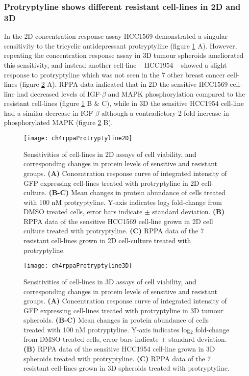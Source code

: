 \documentclass[a4paper,11pt,twoside,openright]{scrbook}
\begin{document}
\subsubsection{Protryptyline shows different resistant cell-lines in 2D and 3D}
In the 2D concentration response assay HCC1569 demonstrated a singular sensitivity to the tricyclic antidepressant 
protryptyline (figure \ref{figure:rppa_protryptyline2D} A).
However, repeating the concentration response assay in 3D tumour spheroids ameliorated this sensitivity, and instead 
another cell-line -- HCC1954 -- showed a slight response to protryptyline which was not seen in the 7 other breast 
cancer cell-lines (figure \ref{figure:rppa_protryptyline3D} A).
RPPA data indicated that in 2D the sensitive HCC1569 cell-line had decreased levels of IGF-$\beta$ and MAPK 
phosphorylation compared to the resistant cell-lines (figure \ref{figure:rppa_protryptyline2D} B \& C), while in 3D the 
sensitive HCC1954 cell-line had a similar decrease in IGF-$\beta$ although a contradictory 2-fold increase in 
phosphorylated MAPK (figure \ref{figure:rppa_protryptyline3D} B).



\begin{figure}
    \captionsetup{width=0.8\textwidth}
    \caption[Sensitivities of cell-lines in 2D to protryptyline]{
    Sensitivities of cell-lines in 2D assays of cell viability, and corresponding changes in protein levels of 
sensitive and resistant groups.
    \textbf{(A)} Concentration response curve of integrated intensity of GFP expressing cell-lines treated with 
protryptyline in 2D cell-culture.
    \textbf{(B-C)} Mean changes in protein abundance of cells treated with 100 nM protryptyline. Y-axis indicates 
log$_2$ fold-change from DMSO treated cells, error bars indicate $\pm$ standard deviation.
    \textbf{(B)} RPPA data of the sensitive HCC1569 cell-line grown in 2D cell culture treated with protryptyline.
    \textbf{(C)} RPPA data of the 7 resistant cell-lines grown in 2D cell-culture treated with protryptyline.
        }
    \texttt{[image: ch4rppaProtryptyline2D]}
    \label{figure:rppa_protryptyline2D}
\end{figure}


\begin{figure}
    \captionsetup{width=0.8\textwidth}
    \caption[Sensitivities of cell-lines in 3D to protryptyline]{
    Sensitivities of cell-lines in 3D assays of cell viability, and corresponding changes in protein levels of 
sensitive and resistant groups.
    \textbf{(A)} Concentration response curve of integrated intensity of GFP expressing cell-lines treated with 
protryptyline in 3D tumour spheroids.
    \textbf{(B-C)} Mean changes in protein abundance of cells treated with 100 nM protryptyline. Y-axis indicates 
log$_2$ fold-change from DMSO treated cells, error bars indicate $\pm$ standard deviation.
    \textbf{(B)} RPPA data of the sensitive HCC1954 cell-line grown in 3D spheroids treated with protryptyline.
    \textbf{(C)} RPPA data of the 7 resistant cell-lines grown in 3D spheroids treated with protryptyline.
        }
    \texttt{[image: ch4rppaProtryptyline3D]}
    \label{figure:rppa_protryptyline3D}
\end{figure}
\end{document}
